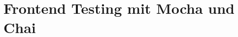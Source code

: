 \section{Frontend Testing mit Mocha und Chai}
\label{sec:t-frontend-testing-mit-mocha-und-chai'}




